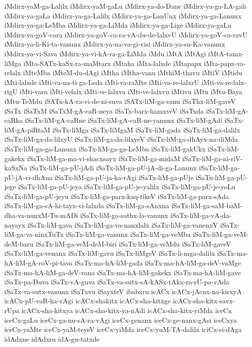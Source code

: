 {iMdirx-yaM-ga-Lalilx
iMdirx-yaM-gaLu
iMdirx-ya-do-Dane
iMdirx-ya-ga-LA-gali
iMdirx-ya-gaLa
iMdirx-ya-ga-Lalilx
iMdirx-ya-ga-LanUnx
iMdirx-ya-ga-Lanunx
iMdirx-ya-ga-LeMba
iMdirx-ya-ga-LiMda
iMdirx-ya-ga-Lige
iMdirx-ya-gaLu
iMdirx-ya-goV-cara
iMdirx-ya-goV-ca-ra-vA-du-de-lalxvU
iMdirx-ya-goV-ca-ravU
iMdirx-ya-li-Ki-ta-vanunx
iMdirx-ya-na-va-gi-visi
iMdirx-ya-su-Ka-vanunx
iMdirx-ya-vi-Sava
iMdirx-ya-vi-kA-ra-ga-LiMda
iMdu
iMtA
iMtAgi
iMtA-tamx-liMga
iMta-SATx-kaSx-ra-maMtarx
iMtaha
iMta-lalxde
iMtapapx
iMta-papx-va-relalx
iMteMba
iMteM-du-dAgi
iMtha
iMtha-vanu
iMthiM-thavu
iMtiV
iMtidu
iMti-lalxde
iMti-va-na-ti-ga-Leda
iMti-va-raMte
iMti-va-re-lalxrU
iMti-va-re-lalx-rigU
iMti-varu
iMti-velalx
iMti-ve-lalxva
iMti-ve-lalxvu
iMtivu
iMtu
iMtu-Baya
iMtu-TeMdu
iSATx-kA-ra-vi-de-ni-suva
iSATx-liM-ga-vanu
iSaThx-liM-gaveV
iSaTx
iSaTxM
iSaTxM-gA-caR-neya
iSaTx-barx-hamxveV
iSaTxda
iSaTx-liM-gA-caRka
iSaTx-liM-gA-caRne
iSaTx-liM-gA-caR-ne-yanunx
iSaTx-liM-gAdi
iSaTx-liM-gA-piRtaM
iSaTx-liMga
iSaTx-liMgaM
iSaTx-liM-gada
iSaTx-liM-ga-dalilx
iSaTx-liM-ga-da-lilxyU
iSaTx-liM-ga-da-lilxyeV
iSaTx-liM-ga-dhAyx-na-diMda
iSaTx-liM-ga-ga-Lanunx
iSaTx-liM-ga-ga-LeMba
iSaTx-liM-gakUkx
iSaTx-liM-gakekx
iSaTx-liM-ga-ma-vi-shacxsayx
iSaTx-liM-ga-midaM
iSaTx-liM-ga-ni-riV-kaSxNa
iSaTx-liM-ga-pU-jAdi
iSaTx-liM-ga-pU-jA-di-ga-Lanunx
iSaTx-liM-ga-pU-jA-vi-dhAna
iSaTx-liM-ga-pU-ja-ka-rAgi
iSaTx-liM-ga-pUje
iSaTx-liM-ga-pU-jege
iSaTx-liM-ga-pU-jeya
iSaTx-liM-ga-pU-je-yalilx
iSaTx-liM-ga-pU-je-yoLu
iSaTx-liM-ga-pU-jeyu
iSaTx-liM-ga-parx-kaq-tikeV
iSaTx-liM-ga-parx-sAda
iSaTx-liM-ga-sA-hi-tayx-vi-lalxda
iSaTx-liM-ga-sAnxna
iSaTx-liM-ga-saM-baM-dha-va-nunxM-Tu-mADi
iSaTx-liM-ga-sathx-la-vanunx
iSaTx-liM-ga-vA-da-nayayx
iSaTx-liM-gava
iSaTx-liM-ga-va-nanxlalx
iSaTx-liM-ga-vanenxV
iSaTx-liM-ga-va-ninxTuTx
iSaTx-liM-ga-vanunx
iSaTx-liM-ga-veMba
iSaTx-liM-ga-veM-deM-baru
iSaTx-liM-ga-veM-deM-biri
iSaTx-liM-ga-veMdu
iSaTx-liM-gaveV
iSaTx-liM-ga-venanx
iSaTx-liM-gavu
iSaTx-liMgeV
iSaTx-li-mga-dalilx
iSaTx-ma-hA-liM-gA-roV-pi-tava
iSaTx-ma-hA-liM-gada
iSaTx-ma-hA-liM-ga-deV-vaMge
iSaTx-ma-hA-liM-ga-deV-vana
iSaTx-ma-hA-liM-gakekx
iSaTx-ma-hA-liM-gave
iSaTx-pa-Duva
iSaTx-vA-guva
iSaTx-va-sutx-sA-kASx-tAkx-ra-rU-pa-vAda
iSaTx-va-sutx-vanunx
iSaTxvu
iSayxteV
ibabxru
icACx
icACx-jAcnx-na-kirxyA
icACx-pU-vaR-ka-vAgi
icACx-shakitx
icACx-sha-kitxge
icACx-sha-kitx-savx-rUpa
icACx-sha-kitxya
icACx-sha-kitx-ya-nAdi
icACx-sha-kitx-yiMda
iceCx
iceCx-gaLu
iceCx-ga-nu-sA-ra-vAgi
iceCx-genanx
iceCx-ge-nanx-gAsi
iceCxya
iceCx-yaMte
iceCx-yaM-teyeV
iceCx-yiMda
iceCx-yuM-TA-dalilx
iciCx-si-dAga
idAdxne
idAdxru
idA-gu-tatxde
}
